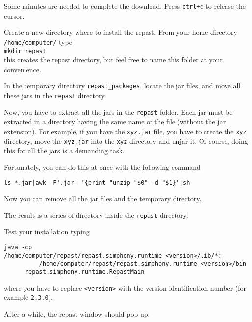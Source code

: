 \documentclass{article}
\begin{document}
Some minutes are needed to complete the download. Press \verb/ctrl+c/ to release the cursor.


Create a new directory where to install the repast. From your home directory \verb+/home/computer/+ type\\
\verb+mkdir repast+\\
this creates the repast directory, but feel free to name this folder at your convenience.

In the temporary directory \verb+repast_packages+, 
locate the 
jar files,  and move all these jars in the \verb+repast+ directory.

Now, you have to extract all the jars in the \verb+repast+ folder. Each jar must be extracted in a directory having the same name of the file (without the jar extension). For example, if you have the \verb+xyz.jar+ file, you have to create the \verb+xyz+ directory, move the  \verb+xyz.jar+ into the \verb+xyz+ directory and unjar it.
Of course, doing this for all the jars is a demanding task.

Fortunately, you can do this at once with the following command

\verb+ls *.jar|awk -F'.jar' '{print "unzip "$0" -d "$1}'|sh+

Now you can remove all the jar files and the temporary directory.

The result is a series of directory inside the \verb+repast+ directory.

Test your installation typing

\begin{verbatim}
java -cp /home/computer/repast/repast.simphony.runtime_<version>/lib/*:
          /home/computer/repast/repast.simphony.runtime_<version>/bin 
	  repast.simphony.runtime.RepastMain
\end{verbatim}
where you have to replace \verb+<version>+ with the version identification number (for example \verb+2.3.0+).

After a while, the repast window should pop up.
\end{document}
